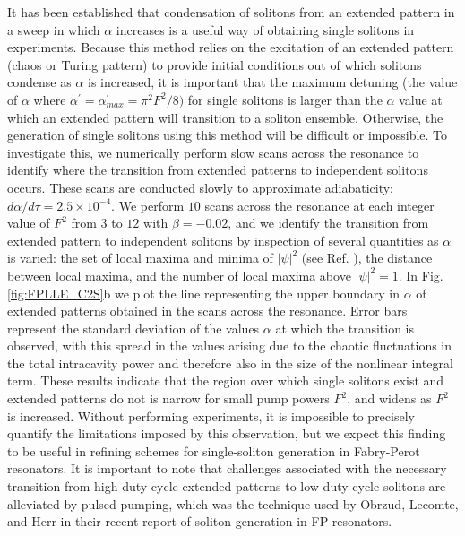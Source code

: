 It has been established that condensation of solitons from an extended pattern in a sweep in which $\alpha$ increases is a useful way of obtaining single solitons in experiments. Because this method relies on the excitation of an extended pattern (chaos or Turing pattern) to provide initial conditions out of which solitons condense as $\alpha$ is increased, it is important that the maximum detuning (the value of $\alpha$ where $\alpha^\prime=\alpha_{max}^\prime=\pi^2 F^2/8)$ for single solitons is larger than the $\alpha$ value at which an extended pattern will transition to a soliton ensemble. Otherwise, the generation of single solitons using this method will be difficult or impossible. To investigate this, we numerically perform slow scans across the resonance to identify where the transition from extended patterns to independent solitons occurs. These scans are conducted slowly to approximate adiabaticity: $d\alpha/d\tau=2.5\times10^{-4}$. We perform $10$ scans across the resonance at each integer value of $F^2$ from $3$ to $12$ with $\beta=-0.02$, and we identify the transition from extended pattern to independent solitons by inspection of several quantities as $\alpha$ is varied: the set of local maxima and minima of $|\psi|^2$ (see Ref. ), the distance between local maxima, and the number of local maxima above $|\psi|^2=1$. In Fig. \ref{fig:FPLLE_C2S}b we plot the line representing the upper boundary in $\alpha$ of extended patterns obtained in the scans across the resonance. Error bars represent the standard deviation of the values $\alpha$ at which the transition is observed, with this spread in the values arising due to the chaotic fluctuations in the total intracavity power and therefore also in the size of the nonlinear integral term. These results indicate that the region over which single solitons exist and extended patterns do not is narrow for small pump powers $F^2$, and widens as $F^2$ is increased. Without performing experiments, it is impossible to precisely quantify the limitations imposed by this observation, but we expect this finding to be useful in refining schemes for single-soliton generation in Fabry-Perot resonators. It is important to note that challenges associated with the necessary transition from high duty-cycle extended patterns to low duty-cycle solitons are alleviated by pulsed pumping, which was the technique used by Obrzud, Lecomte, and Herr in their recent report of soliton generation in FP resonators.




